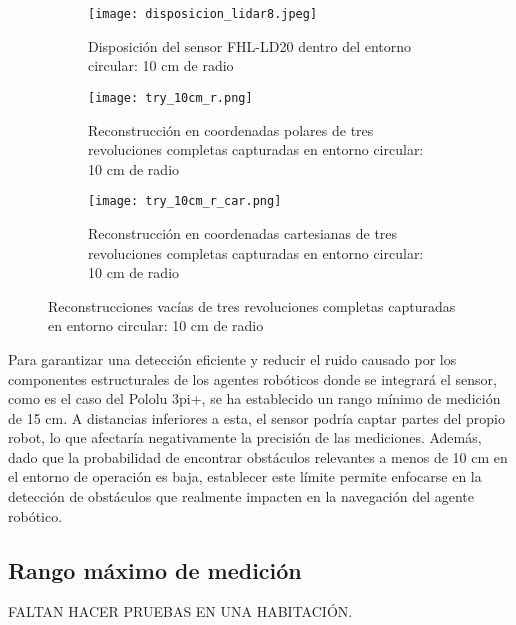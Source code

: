 \begin{figure}[H]
	\centering
	\begin{subfigure}{0.6\textwidth}
		\centering
		\texttt{[image: disposicion\_lidar8.jpeg]}
		\caption{Disposición del sensor FHL-LD20 dentro del entorno circular: 10 cm de radio}
		\label{disposicion_lidar8}
		\vspace{1em}
	\end{subfigure}
	\begin{subfigure}{0.45\textwidth}
		\centering
		\texttt{[image: try\_10cm\_r.png]}
		\caption{Reconstrucción en coordenadas polares de tres revoluciones completas capturadas en entorno circular: 10 cm de radio}
		\label{try_10cm_r}
	\end{subfigure}
	\hspace{1em}
	\begin{subfigure}{0.45\textwidth}
		\centering
		\texttt{[image: try\_10cm\_r\_car.png]}
		\caption{Reconstrucción en coordenadas cartesianas de tres revoluciones completas capturadas en entorno circular: 10 cm de radio}
		\label{try_10cm_r_car}
	\end{subfigure}
	\caption{Reconstrucciones vacías de tres revoluciones completas capturadas en entorno circular: 10 cm de radio}
	\label{fig: reconstrucciones_10}
\end{figure}

Para garantizar una detección eficiente y reducir el ruido causado por los componentes estructurales de los agentes robóticos donde se integrará el sensor, como es el caso del Pololu 3pi+, se ha establecido un rango mínimo de medición de 15 cm. A distancias inferiores a  esta, el sensor podría captar partes del propio robot, lo que afectaría negativamente la precisión de las mediciones. Además, dado que la probabilidad de encontrar obstáculos relevantes a menos de 10 cm en el entorno de operación es baja, establecer este límite permite enfocarse en la detección de obstáculos que realmente impacten en la navegación del agente robótico.

\subsection{Rango máximo de medición}
FALTAN HACER PRUEBAS EN UNA HABITACIÓN.

